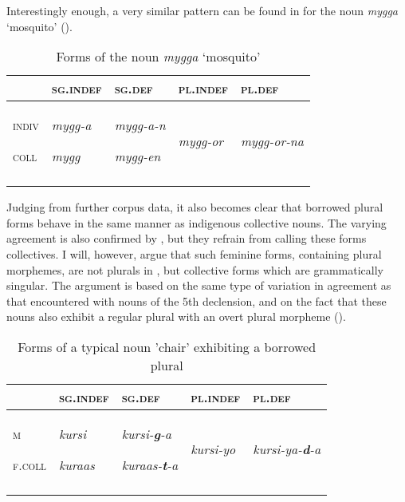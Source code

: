 \documentclass[output=paper]{langsci/langscibook}
\begin{document}
Interestingly enough, a very similar pattern can be found in  for the noun \textit{mygga} ‘mosquito’ ().\textit{} 


\begin{table}[p]
\caption{Forms of the  noun \textit{mygga} ‘mosquito’}
\label{tab:nilsson:11}
\begin{tabularx}{\textwidth}{XXXXX} 
\lsptoprule
& {\textsc{sg.indef}} & {\textsc{sg.def}} & {\textsc{pl.indef}} & {\textsc{pl.def}}\\
\midrule
{\textsc{indiv}}

{\textsc{coll}} & {\textit{mygg-a}}

{\textit{mygg}} & {\textit{mygg-a-n}}

{\textit{mygg-en}} & {\textit{mygg-or}} & {\textit{mygg-or-na}}\\
\lspbottomrule
\end{tabularx}

\end{table} 



Judging from further corpus data, it also becomes clear that borrowed  plural forms behave in the same manner as indigenous  collective nouns. The varying agreement is also confirmed by \citet[86]{Siyaad1984}, but they refrain from calling these forms collectives. I will, however, argue that such feminine forms, containing  plural morphemes, are not plurals in , but collective forms which are grammatically singular. The argument is based on the same type of variation in agreement as that encountered with nouns of the 5th declension, and on the fact that these nouns also exhibit a regular plural with an overt  plural morpheme ().
 
\begin{table}[p]
\caption{Forms of a typical noun 'chair' exhibiting a borrowed  plural}
\label{tab:nilsson:12}
\begin{tabularx}{\textwidth}{XXXXX}
\lsptoprule
 & {\textsc{sg.indef}} & {\textsc{sg.def}} & {\textsc{pl.indef}} & {\textsc{pl.def}}\\
\midrule
{\textsc{m}}

{\textsc{f.coll}} & {\textit{kursi}}

{\textit{kuraas}} & {\textit{kursi-}\textbf{\textit{g}}\textit{-a}}

{\textit{kuraas-}\textbf{\textit{t}}\textit{-a}} & {\textit{kursi-yo}} & {\textit{kursi-ya-}\textbf{\textit{d}}\textit{-a}}\\
\lspbottomrule
\end{tabularx}

\end{table} 
\end{document}
